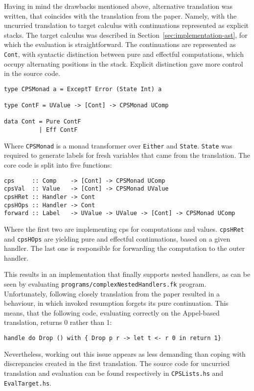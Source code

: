 \documentclass[declaration,shortabstract]{iithesis}
\theoremstyle{definition} \newtheorem{definition}{Definition}[chapter]
\theoremstyle{remark} \newtheorem{remark}[definition]{Observation}
\theoremstyle{plain} \newtheorem{theorem}[definition]{Theorem}
\theoremstyle{plain} \newtheorem{lemma}[definition]{Lemma}
\begin{document}
    Having in mind the drawbacks mentioned above, alternative translation was
    written, that coincides with the translation from the paper. Namely, with
    the uncurried translation to target calculus with continuations represented
    as explicit stacks. The target calculus was described in Section~\ref{sec:implementation-ast},
    for which the evaluation is straightforward. The continuations are represented
    as \verb!Cont!, with syntactic distinction between pure and effectful computations,
    which occupy alternating positions in the stack. Explicit distinction gave
    more control in the source code.

    \begin{verbatim}
type CPSMonad a = ExceptT Error (State Int) a

type ContF = UValue -> [Cont] -> CPSMonad UComp

data Cont = Pure ContF
          | Eff ContF
    \end{verbatim}
    Where \verb!CPSMonad! is a monad transformer over \verb!Either! and \verb!State!.
    \verb!State! was required to generate labels for fresh variables that
    came from the translation. The core code is split into five functions:

    \begin{verbatim}
cps     :: Comp    -> [Cont] -> CPSMonad UComp
cpsVal  :: Value   -> [Cont] -> CPSMonad UValue
cpsHRet :: Handler -> Cont
cpsHOps :: Handler -> Cont
forward :: Label   -> UValue -> UValue -> [Cont] -> CPSMonad UComp
    \end{verbatim}
    Where the first two are implementing cps for computations and values.
    \verb!cpsHRet! and \verb!cpsHOps! are yielding pure and effectful continuations,
    based on a given handler. The last one is responsible for forwarding the
    computation to the outer handler.

    This results in an implementation that finally supports nested handlers,
    as can be seen by evaluating \verb!programs/complexNestedHandlers.fk! program.
    Unfortunately, following closely translation from the paper resulted in
    a behaviour, in which invoked resumption forgets its pure continuation. This means,
    that the following code, evaluating correctly on the Appel-based translation,
    returns 0 rather than 1:

    \begin{verbatim}
handle do Drop () with { Drop p r -> let t <- r 0 in return 1}
    \end{verbatim}
    Nevertheless, working out this issue appears as less demanding than coping with
    discrepancies created in the first translation. The source code for uncurried
    translation and evaluation can be found respectively in \verb!CPSLists.hs! and
    \verb!EvalTarget.hs!.
\end{document}
